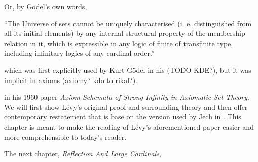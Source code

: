 
Or, by Gödel's own words,

\begin{displayquote}
``The Universe of sets cannot be uniquely characterised (i. e. distinguished from all its initial elements) by any internal structural property of the membership relation in it, which is expressible in any logic of finite of transfinite type, including infinitary logics of any cardinal order.''
\end{displayquote}

which was first explicitly used by Kurt Gödel in his (TODO KDE?), but it was implicit in axioms (axiomy? kdo to rikal?).

 in his 1960 paper \emph{Axiom Schemata of Strong Infinity in Axiomatic Set Theory}\cite{Levy60a}. We will first show Lévy's original proof and surrounding theory and then offer contemporary restatement that is base on the version used by Jech in \cite{JechBook}. This chapter is meant to make the reading of Lévy's aforementioned paper easier and more comprehensible to today's reader.

The next chapter, \emph{Reflection And Large Cardinals},  %





